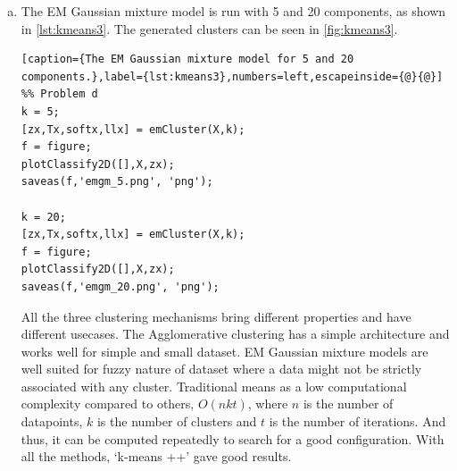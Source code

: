 \documentclass[a4paper, 11pt]{article}
\begin{document}
\begin{enumerate}[(a)]
\begin{lstlisting}[caption={Agglomerative clustering on iris dataset for different values of k and linkage methods.},label={lst:kmeans2},numbers=left,escapeinside={@}{@}]
Z = linkage(X,'complete');
c = cluster(Z,'maxclust',k);
f = figure;
plotClassify2D([],X,c);
saveas(f,'linkage_complete_5.png', 'png');

k = 20;
Z = linkage(X,'single');
c = cluster(Z,'maxclust',k);
f = figure;
plotClassify2D([],X,c);
saveas(f,'linkage_single_20.png', 'png');
f = figure;
dendrogram(Z)
saveas(f,'dendogram_20.png', 'png');

Z = linkage(X,'complete');
c = cluster(Z,'maxclust',k);
f = figure;
plotClassify2D([],X,c);
saveas(f,'linkage_complete_20.png', 'png');
\end{lstlisting}
\item The EM Gaussian mixture model is run with 5 and 20 components, as shown in \autoref{lst:kmeans3}. The generated clusters can be seen in \autoref{fig:kmeans3}.
\begin{lstlisting}[caption={The EM Gaussian mixture model for 5 and 20 components.},label={lst:kmeans3},numbers=left,escapeinside={@}{@}]
%% Problem d
k = 5;
[zx,Tx,softx,llx] = emCluster(X,k);
f = figure;
plotClassify2D([],X,zx);
saveas(f,'emgm_5.png', 'png');

k = 20;
[zx,Tx,softx,llx] = emCluster(X,k);
f = figure;
plotClassify2D([],X,zx);
saveas(f,'emgm_20.png', 'png');
\end{lstlisting}
All the three clustering mechanisms bring different properties and have different usecases. The Agglomerative clustering has a simple architecture and works well for simple and small dataset. EM Gaussian mixture models are well suited for fuzzy nature of dataset where a data might not be strictly associated with any cluster. Traditional means as a low computational complexity compared to others, $O(nkt)$, where $n$ is the number of datapoints, $k$ is the number of clusters and $t$ is the number of iterations. And thus, it can be computed repeatedly to search for a good configuration. With all the methods, `k-means ++' gave good results.
\end{enumerate}
\end{document}

